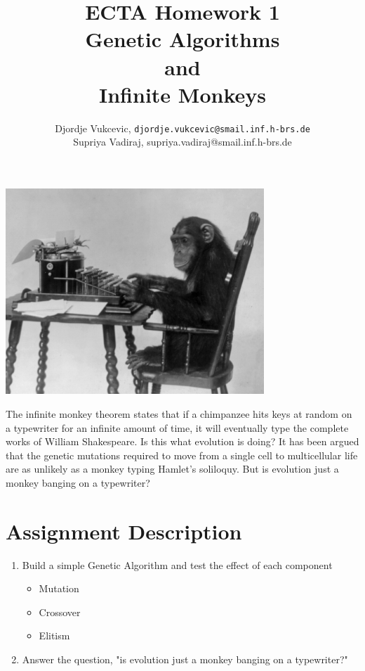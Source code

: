 \documentclass{article}
\title{ECTA Homework 1\\Genetic Algorithms\\and\\Infinite Monkeys}
\author{\color{red} Djordje Vukcevic, \texttt{djordje.vukcevic@smail.inf.h-brs.de}\\
\color{red}	Supriya Vadiraj, supriya.vadiraj@smail.inf.h-brs.de}
\begin{document}
\maketitle

\begin{center}
\begin{minipage}{1\linewidth}
	\begin{center}
    \includegraphics[width=0.73\textwidth]{img/chimp}  
    \end{center}
    
	{\large The infinite monkey theorem states that if a chimpanzee hits keys at random on a typewriter for an infinite amount of time, it will eventually type the complete works of William Shakespeare. Is this what evolution is doing? It has been argued that the genetic mutations required to move from a single cell to multicellular life are as unlikely as a monkey typing Hamlet's soliloquy. But is evolution just a monkey banging on a typewriter?}	
\end{minipage}
\end{center}

\section{Assignment Description}
	\begin{enumerate}
		\item Build a simple Genetic Algorithm and test the effect of each component
		\begin{itemize}
			\item Mutation
			\item Crossover
			\item Elitism		
		\end{itemize}
		\item Answer the question, "is evolution just a monkey banging on a typewriter?"	
	\end{enumerate}
\end{document}

